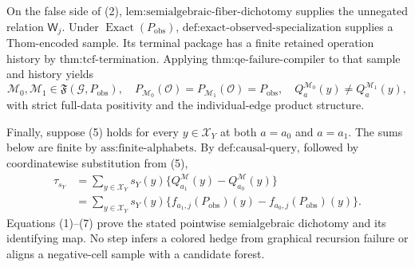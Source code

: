 On the false side of (2), \(\text{lem:semialgebraic-fiber-dichotomy}\) supplies the unnegated relation \(\mathsf W_j\). Under \(\operatorname{Exact}(P_{\mathrm{obs}})\), \(\text{def:exact-observed-specialization}\) supplies a Thom-encoded sample. Its terminal package has a finite retained operation history by \(\text{thm:tcf-termination}\). Applying \(\text{thm:qe-failure-compiler}\) to that sample and history yields
\[
\mathcal M_0,\mathcal M_1\in\mathfrak F(\mathcal G,P_{\mathrm{obs}}),
\quad
P_{\mathcal M_0}(\mathcal O)=P_{\mathcal M_1}(\mathcal O)=P_{\mathrm{obs}},
\quad
Q_a^{\mathcal M_0}(y)\neq Q_a^{\mathcal M_1}(y),
\tag{6}
\]
with strict full-data positivity and the individual-edge product structure.

Finally, suppose (5) holds for every \(y\in\mathcal X_Y\) at both \(a=a_0\) and \(a=a_1\). The sums below are finite by \(\text{ass:finite-alphabets}\). By \(\text{def:causal-query}\), followed by coordinatewise substitution from (5),
\[
\begin{aligned}
\tau_{s_Y}
&=\sum_{y\in\mathcal X_Y}s_Y(y)
\{Q_{a_1}^{\mathcal M}(y)-Q_{a_0}^{\mathcal M}(y)\}\\
&=\sum_{y\in\mathcal X_Y}s_Y(y)
\{f_{a_1,j}(P_{\mathrm{obs}})(y)-f_{a_0,j}(P_{\mathrm{obs}})(y)\}.
\end{aligned}
\tag{7}
\]
Equations (1)--(7) prove the stated pointwise semialgebraic dichotomy and its identifying map. No step infers a colored hedge from graphical recursion failure or aligns a negative-cell sample with a candidate forest.